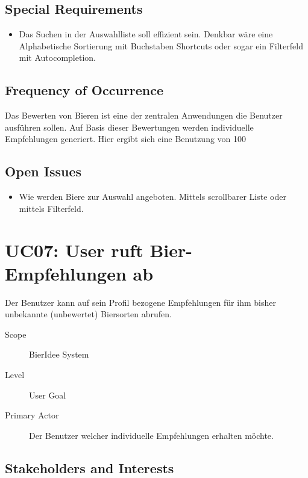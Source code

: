\documentclass[10pt,a4paper]{scrartcl}
\begin{document}
\subsection*{Special Requirements}

\begin{itemize}
\item Das Suchen in der Auswahlliste soll effizient sein. Denkbar wäre eine Alphabetische Sortierung  mit Buchstaben Shortcuts oder sogar ein Filterfeld mit Autocompletion.
\end{itemize}



\subsection*{Frequency of Occurrence}

Das Bewerten von Bieren ist eine der zentralen Anwendungen die Benutzer ausführen sollen.
Auf Basis dieser Bewertungen werden individuelle Empfehlungen generiert. Hier ergibt sich eine Benutzung von 100%

\subsection*{Open Issues}

\begin{itemize}
\item Wie werden Biere zur Auswahl angeboten. Mittels scrollbarer Liste oder mittels Filterfeld.
\end{itemize}



\section*{UC07: User ruft Bier-Empfehlungen ab}
Der Benutzer kann auf sein Profil bezogene Empfehlungen für ihm bisher unbekannte (unbewertet) Biersorten abrufen.

\begin{description}
\item[Scope] BierIdee System
\item[Level] User Goal
\item[Primary Actor] Der Benutzer welcher individuelle Empfehlungen erhalten möchte.
\end{description}


\subsection*{Stakeholders and Interests}
\end{document}
